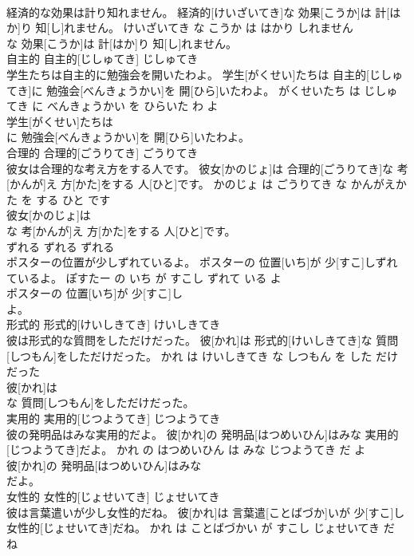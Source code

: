 \documentclass[8pt]{extreport}
\begin{document}
\begin{CJK}{UTF8}{min}
\\	経済的な効果は計り知れません。	経済的[けいざいてき]な 効果[こうか]は 計[はか]り 知[し]れません。	けいざいてき な こうか は はかり しれません	
\\	な 効果[こうか]は 計[はか]り 知[し]れません。			
\\	自主的	自主的[じしゅてき]	じしゅてき	
\\	学生たちは自主的に勉強会を開いたわよ。	学生[がくせい]たちは 自主的[じしゅてき]に 勉強会[べんきょうかい]を 開[ひら]いたわよ。	がくせいたち は じしゅてき に べんきょうかい を ひらいた わ よ	
\\	学生[がくせい]たちは
\\	に 勉強会[べんきょうかい]を 開[ひら]いたわよ。			
\\	合理的	合理的[ごうりてき]	ごうりてき	
\\	彼女は合理的な考え方をする人です。	彼女[かのじょ]は 合理的[ごうりてき]な 考[かんが]え 方[かた]をする 人[ひと]です。	かのじょ は ごうりてき な かんがえかた を する ひと です	
\\	彼女[かのじょ]は
\\	な 考[かんが]え 方[かた]をする 人[ひと]です。			
\\	ずれる	ずれる	ずれる	
\\	ポスターの位置が少しずれているよ。	ポスターの 位置[いち]が 少[すこ]しずれているよ。	ぽすたー の いち が すこし ずれて いる よ	
\\	ポスターの 位置[いち]が 少[すこ]し
\\	よ。			
\\	形式的	形式的[けいしきてき]	けいしきてき	
\\	彼は形式的な質問をしただけだった。	彼[かれ]は 形式的[けいしきてき]な 質問[しつもん]をしただけだった。	かれ は けいしきてき な しつもん を した だけ だった	
\\	彼[かれ]は
\\	な 質問[しつもん]をしただけだった。			
\\	実用的	実用的[じつようてき]	じつようてき	
\\	彼の発明品はみな実用的だよ。	彼[かれ]の 発明品[はつめいひん]はみな 実用的[じつようてき]だよ。	かれ の はつめいひん は みな じつようてき だ よ	
\\	彼[かれ]の 発明品[はつめいひん]はみな
\\	だよ。			
\\	女性的	女性的[じょせいてき]	じょせいてき	
\\	彼は言葉遣いが少し女性的だね。	彼[かれ]は 言葉遣[ことばづか]いが 少[すこ]し 女性的[じょせいてき]だね。	かれ は ことばづかい が すこし じょせいてき だ ね	

\end{CJK}
\end{document}
